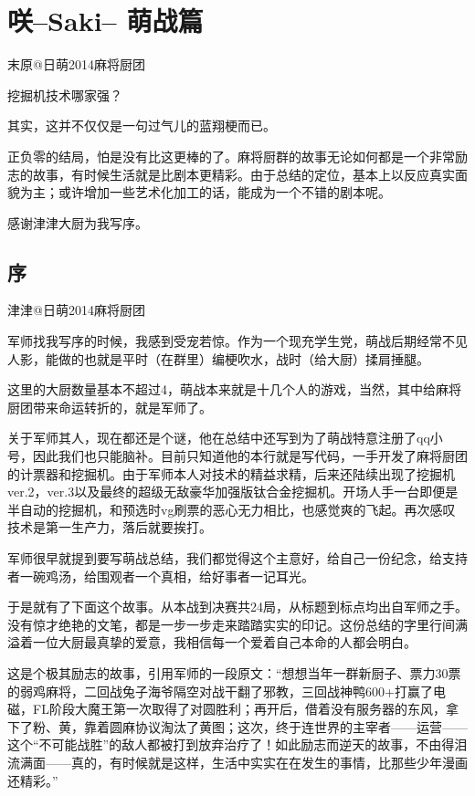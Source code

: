 
\chapter{咲–Saki– 萌战篇}

末原@日萌2014麻将厨团

挖掘机技术哪家强？

其实，这并不仅仅是一句过气儿的蓝翔梗而已。

正负零的结局，怕是没有比这更棒的了。麻将厨群的故事无论如何都是一个非常励志的故事，有时候生活就是比剧本更精彩。由于总结的定位，基本上以反应真实面貌为主；或许增加一些艺术化加工的话，能成为一个不错的剧本呢。

感谢津津大厨为我写序。

\section*{序}

津津@日萌2014麻将厨团

军师找我写序的时候，我感到受宠若惊。作为一个现充学生党，萌战后期经常不见人影，能做的也就是平时（在群里）编梗吹水，战时（给大厨）揉肩捶腿。

这里的大厨数量基本不超过4，萌战本来就是十几个人的游戏，当然，其中给麻将厨团带来命运转折的，就是军师了。

关于军师其人，现在都还是个谜，他在总结中还写到为了萌战特意注册了qq小号，因此我们也只能脑补。目前只知道他的本行就是写代码，一手开发了麻将厨团的计票器和挖掘机。由于军师本人对技术的精益求精，后来还陆续出现了挖掘机ver.2，ver.3以及最终的超级无敌豪华加强版钛合金挖掘机。开场人手一台即便是半自动的挖掘机，和预选时vg刷票的恶心无力相比，也感觉爽的飞起。再次感叹技术是第一生产力，落后就要挨打。

军师很早就提到要写萌战总结，我们都觉得这个主意好，给自己一份纪念，给支持者一碗鸡汤，给围观者一个真相，给好事者一记耳光。

于是就有了下面这个故事。从本战到决赛共24局，从标题到标点均出自军师之手。没有惊才绝艳的文笔，都是一步一步走来踏踏实实的印记。这份总结的字里行间满溢着一位大厨最真挚的爱意，我相信每一个爱着自己本命的人都会明白。

这是个极其励志的故事，引用军师的一段原文：“想想当年一群新厨子、票力30票的弱鸡麻将，二回战兔子海爷隔空对战干翻了邪教，三回战神鸭600+打赢了电磁，FL阶段大魔王第一次取得了对圆胜利；再开后，借着没有服务器的东风，拿下了粉、黄，靠着圆麻协议淘汰了黄图；这次，终于连世界的主宰者——运营——这个“不可能战胜”的敌人都被打到放弃治疗了！如此励志而逆天的故事，不由得泪流满面——真的，有时候就是这样，生活中实实在在发生的事情，比那些少年漫画还精彩。”


